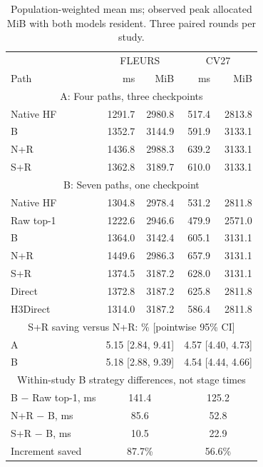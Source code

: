 \begin{table}[!t]\centering\footnotesize
\caption{Population-weighted mean ms; observed peak allocated MiB with both models resident. Three paired rounds per study.}\label{tab:cost}
\setlength{\tabcolsep}{4pt}\renewcommand{\arraystretch}{1.00}
\begin{tabular}{@{}lrrrr@{}}\toprule
 & \multicolumn{2}{c}{FLEURS} & \multicolumn{2}{c}{CV27}\\
Path & ms & MiB & ms & MiB\\\midrule
\multicolumn{5}{c}{A: Four paths, three checkpoints}\\
Native HF & 1291.7 & 2980.8 & 517.4 & 2813.8\\
B & 1352.7 & 3144.9 & 591.9 & 3133.1\\
N+R & 1436.8 & 2988.3 & 639.2 & 3133.1\\
S+R & 1362.8 & 3189.7 & 610.0 & 3133.1\\
\midrule
\multicolumn{5}{c}{B: Seven paths, one checkpoint}\\
Native HF & 1304.8 & 2978.4 & 531.2 & 2811.8\\
Raw top-1 & 1222.6 & 2946.6 & 479.9 & 2571.0\\
B & 1364.0 & 3142.4 & 605.1 & 3131.1\\
N+R & 1449.6 & 2986.3 & 657.9 & 3131.1\\
S+R & 1374.5 & 3187.2 & 628.0 & 3131.1\\
Direct & 1372.8 & 3187.2 & 625.8 & 2811.8\\
H3Direct & 1314.0 & 3187.2 & 586.4 & 2811.8\\
\midrule
\multicolumn{5}{c}{S+R saving versus N+R: \% [pointwise 95\% CI]}\\
A & \multicolumn{2}{c}{5.15 [2.84, 9.41]} & \multicolumn{2}{c}{4.57 [4.40, 4.73]}\\
B & \multicolumn{2}{c}{5.18 [2.88, 9.39]} & \multicolumn{2}{c}{4.54 [4.44, 4.66]}\\
\midrule
\multicolumn{5}{c}{Within-study B strategy differences, not stage times}\\
B $-$ Raw top-1, ms & \multicolumn{2}{c}{141.4} & \multicolumn{2}{c}{125.2}\\
N+R $-$ B, ms & \multicolumn{2}{c}{85.6} & \multicolumn{2}{c}{52.8}\\
S+R $-$ B, ms & \multicolumn{2}{c}{10.5} & \multicolumn{2}{c}{22.9}\\
Increment saved & \multicolumn{2}{c}{87.7\%} & \multicolumn{2}{c}{56.6\%}\\
\bottomrule\end{tabular}\end{table}
